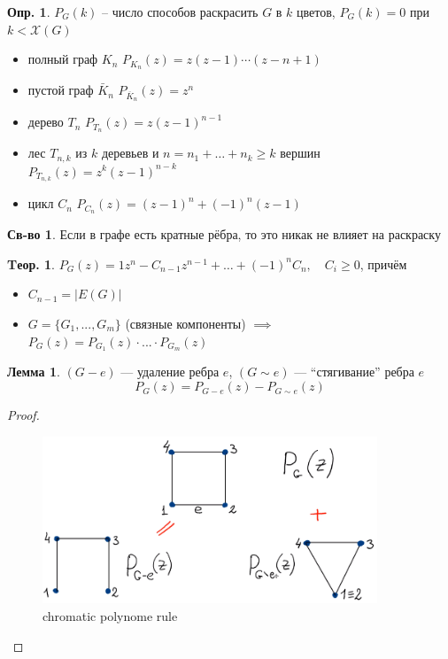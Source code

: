 \documentclass[a4paper,12pt]{article}
\numberwithin{figure}{section}
\theoremstyle{definition}
\newtheorem{definition}{Опр.}[section]
\newtheorem*{property}{Св-во}  %
\theoremstyle{definition}
\newtheorem{theorem}{Tеор.}[section]
\newtheorem{lemma}{Лемма}[section]
\def\iiChi{\mathcal{X}}
\begin{document}
\begin{definition}
	$P_G(k)$ -- число способов раскрасить $G$ в $k$ цветов, $P_G(k)=0$ при $k<\iiChi(G)$
\end{definition}

\begin{itemize}
	\item полный граф $K_n$ \quad $P_{K_n}(z) = z(z-1)\cdots(z-n+1)$
	\item пустой граф $\bar{K}_n$ \quad $P_{\overline{K}_n}(z) = z^n$
	\item дерево $T_n$ \quad $P_{T_n}(z) = z(z-1)^{n-1}$
	\item лес $T_{n,k}$ из $k$ деревьев и $n=n_1+\dots+n_k \geqslant k$ вершин \quad $P_{T_{n,k}}(z) = z^k(z-1)^{n-k}$
	\item цикл $C_{n}$ \quad $P_{C_{n}}(z) = (z-1)^n + (-1)^n(z-1)$
\end{itemize}

\begin{property}
	Если в графе есть кратные рёбра, то это никак не влияет на раскраску
\end{property}

\begin{theorem}
	$ P_G(z) = 1 z^n - C_{n-1} z^{n-1} +\dots + (-1)^n C_n, \quad C_i \geqslant 0 $,
	причём
	\begin{itemize}
		\item  $C_{n-1} = |E(G)|$
		\item  $G=\{G_1,...,G_m\}$ (связные компоненты)
		       $\implies$ $P_G(z) = P_{G_1}(z) \cdot ... \cdot P_{G_m}(z)$ 
	\end{itemize}
\end{theorem}

\def\iiRemoveEdge{-}
\def\iiPullEdge{\sim}

\begin{lemma} $(G \iiRemoveEdge e)$ --- удаление ребра $e$,
	          $(G \iiPullEdge e)$ --- ``стягивание'' ребра $e$
	\[ P_{G}(z) = P_{G \iiRemoveEdge e}(z) - P_{G \iiPullEdge e}(z) \]
\end{lemma}
\begin{proof}
	\hspace{1pt}
	\begin{figure}[H]
		\centering
		\includegraphics[width=10cm]{chromatic-polynome-rule.png}
		\caption{chromatic polynome rule}
	\end{figure}
	\hspace{1pt}
\end{proof}
\end{document}

